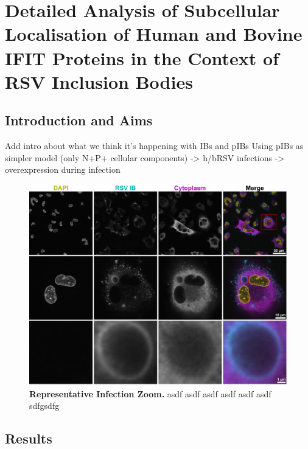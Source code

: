 \chapter{Detailed Analysis of Subcellular Localisation of Human and Bovine IFIT Proteins in the Context of RSV Inclusion Bodies} \label{Detailed Analysis of Subcellular Localisation of Human and Bovine IFIT Proteins in the Context of RSV Inclusion Bodies}

\section{Introduction and Aims} \label{Introduction and Aims-Chapter3}
Add intro about what we think it’s happening with IBs and pIBs \newline
Using pIBs as simpler model (only N+P+ cellular components) -> h/bRSV infections -> overexpression during infection

\begin{figure}
    \centering
    \includegraphics[width=1\linewidth]{08. Chapter 3//Figs//01. Introduction/IB-zooms.pdf}
    \caption[Representative Infection Zoom.]{\textbf{Representative Infection Zoom.} asdf asdf asdf asdf asdf asdf sdfgsdfg}
    \label{Representative Infection Zoom}
\end{figure}

\section{Results} \label{Results-Chapter3}




